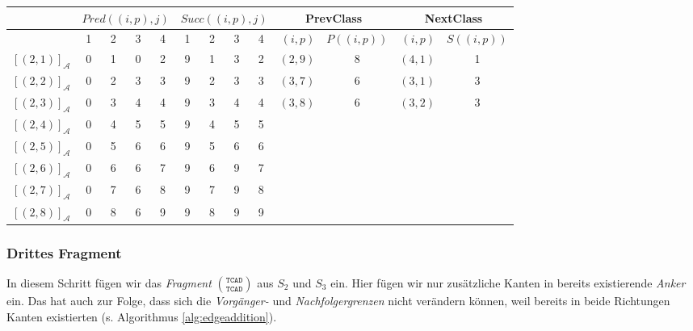 \vspace{5pt}
\small
\begin{tabular}{r|cccc|cccc||r|c|r|c}
	& \multicolumn{4}{c|}{$Pred((i,p),j)$} & \multicolumn{4}{c||}{$Succ((i,p),j)$} & \multicolumn{2}{c|}{\textrm{PrevClass}} & \multicolumn{2}{c}{\textrm{NextClass}} \\ \hline
	\diagbox[dir=NW]{$(i,p)$}{$j$} & 1 & 2 & 3 & 4 & 1 & 2 & 3 & 4 & $(i,p)$ & $P((i,p))$ & $(i,p)$ & $S((i,p))$ \\ \hline
	$[(2,1)]_{\mathcal{A}}$ & 0 & 1 & 0 & 2 & 9 & 1 & 3 & 2 & $(2,9)$ & 8 & $(4,1)$ & 1 \\
	$[(2,2)]_{\mathcal{A}}$ & 0 & 2 & 3 & 3 & 9 & 2 & 3 & 3 & $(3,7)$ & 6 & $(3,1)$ & 3 \\
	$[(2,3)]_{\mathcal{A}}$ & 0 & 3 & 4 & 4 & 9 & 3 & 4 & 4 & $(3,8)$ & 6 & $(3,2)$ & 3 \\
	$[(2,4)]_{\mathcal{A}}$ & 0 & 4 & 5 & 5 & 9 & 4 & 5 & 5 & & & & \\
	$[(2,5)]_{\mathcal{A}}$ & 0 & 5 & 6 & 6 & 9 & 5 & 6 & 6 & & & & \\
	$[(2,6)]_{\mathcal{A}}$ & 0 & 6 & 6 & 7 & 9 & 6 & 9 & 7 & & & & \\
	$[(2,7)]_{\mathcal{A}}$ & 0 & 7 & 6 & 8 & 9 & 7 & 9 & 8 & & & & \\
	$[(2,8)]_{\mathcal{A}}$ & 0 & 8 & 6 & 9 & 9 & 8 & 9 & 9 & & & &
\end{tabular}
\normalsize

\subsubsection{Drittes Fragment}

In diesem Schritt fügen wir das \emph{Fragment} ${\texttt{TCAD}}\choose{\texttt{TCAD}}$ aus $S_2$ und $S_3$ ein. Hier fügen wir nur zusätzliche Kanten in bereits existierende \emph{Anker} ein. Das hat auch zur Folge, dass sich die \emph{Vorgänger-} und \emph{Nachfolgergrenzen} nicht verändern können, weil bereits in beide Richtungen Kanten existierten (s. Algorithmus \ref{alg:edgeaddition}).

